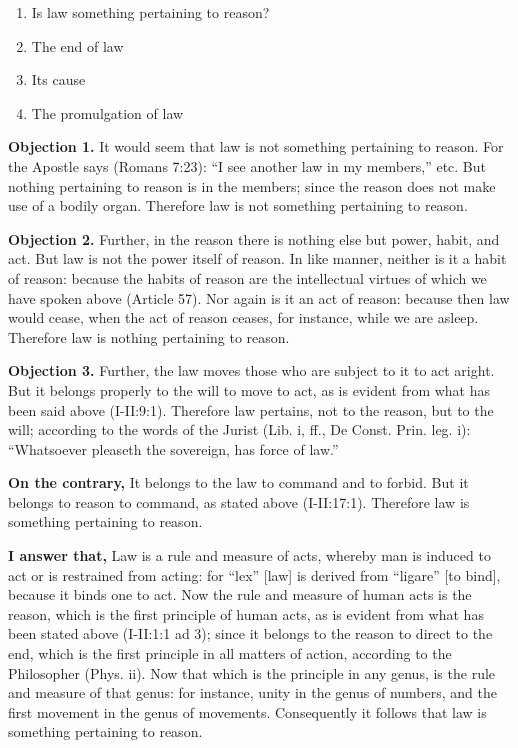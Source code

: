


\begin{enumerate}

\item  Is law something pertaining to reason? 
\item  The end of law 
\item  Its cause 
\item  The promulgation of law 
\end{enumerate}


\textbf{Objection 1.} It would seem that law is not something pertaining to reason. For the Apostle says (Romans 7:23): ``I see another law in my members,'' etc. But nothing pertaining to reason is in the members; since the reason does not make use of a bodily organ. Therefore law is not something pertaining to reason.

\textbf{Objection 2.} Further, in the reason there is nothing else but power, habit, and act. But law is not the power itself of reason. In like manner, neither is it a habit of reason: because the habits of reason are the intellectual virtues of which we have spoken above (Article 57). Nor again is it an act of reason: because then law would cease, when the act of reason ceases, for instance, while we are asleep. Therefore law is nothing pertaining to reason.

\textbf{Objection 3.} Further, the law moves those who are subject to it to act aright. But it belongs properly to the will to move to act, as is evident from what has been said above (I-II:9:1). Therefore law pertains, not to the reason, but to the will; according to the words of the Jurist (Lib. i, ff., De Const. Prin. leg. i): ``Whatsoever pleaseth the sovereign, has force of law.''

\textbf{On the contrary,} It belongs to the law to command and to forbid. But it belongs to reason to command, as stated above (I-II:17:1). Therefore law is something pertaining to reason.

\textbf{I answer that,} Law is a rule and measure of acts, whereby man is induced to act or is restrained from acting: for ``lex'' [law] is derived from ``ligare'' [to bind], because it binds one to act. Now the rule and measure of human acts is the reason, which is the first principle of human acts, as is evident from what has been stated above (I-II:1:1 ad 3); since it belongs to the reason to direct to the end, which is the first principle in all matters of action, according to the Philosopher (Phys. ii). Now that which is the principle in any genus, is the rule and measure of that genus: for instance, unity in the genus of numbers, and the first movement in the genus of movements. Consequently it follows that law is something pertaining to reason.

